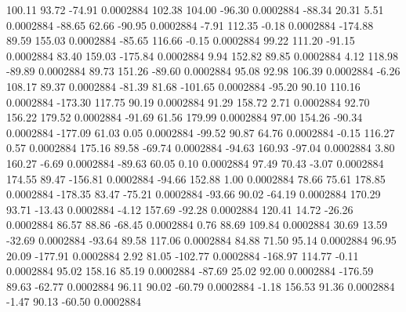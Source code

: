       100.11       93.72      -74.91     0.0002884
      102.38      104.00      -96.30     0.0002884
      -88.34       20.31        5.51     0.0002884
      -88.65       62.66      -90.95     0.0002884
       -7.91      112.35       -0.18     0.0002884
     -174.88       89.59      155.03     0.0002884
      -85.65      116.66       -0.15     0.0002884
       99.22      111.20      -91.15     0.0002884
       83.40      159.03     -175.84     0.0002884
        9.94      152.82       89.85     0.0002884
        4.12      118.98      -89.89     0.0002884
       89.73      151.26      -89.60     0.0002884
       95.08       92.98      106.39     0.0002884
       -6.26      108.17       89.37     0.0002884
      -81.39       81.68     -101.65     0.0002884
      -95.20       90.10      110.16     0.0002884
     -173.30      117.75       90.19     0.0002884
       91.29      158.72        2.71     0.0002884
       92.70      156.22      179.52     0.0002884
      -91.69       61.56      179.99     0.0002884
       97.00      154.26      -90.34     0.0002884
     -177.09       61.03        0.05     0.0002884
      -99.52       90.87       64.76     0.0002884
       -0.15      116.27        0.57     0.0002884
      175.16       89.58      -69.74     0.0002884
      -94.63      160.93      -97.04     0.0002884
        3.80      160.27       -6.69     0.0002884
      -89.63       60.05        0.10     0.0002884
       97.49       70.43       -3.07     0.0002884
      174.55       89.47     -156.81     0.0002884
      -94.66      152.88        1.00     0.0002884
       78.66       75.61      178.85     0.0002884
     -178.35       83.47      -75.21     0.0002884
      -93.66       90.02      -64.19     0.0002884
      170.29       93.71      -13.43     0.0002884
       -4.12      157.69      -92.28     0.0002884
      120.41       14.72      -26.26     0.0002884
       86.57       88.86      -68.45     0.0002884
        0.76       88.69      109.84     0.0002884
       30.69       13.59      -32.69     0.0002884
      -93.64       89.58      117.06     0.0002884
       84.88       71.50       95.14     0.0002884
       96.95       20.09     -177.91     0.0002884
        2.92       81.05     -102.77     0.0002884
     -168.97      114.77       -0.11     0.0002884
       95.02      158.16       85.19     0.0002884
      -87.69       25.02       92.00     0.0002884
     -176.59       89.63      -62.77     0.0002884
       96.11       90.02      -60.79     0.0002884
       -1.18      156.53       91.36     0.0002884
       -1.47       90.13      -60.50     0.0002884
